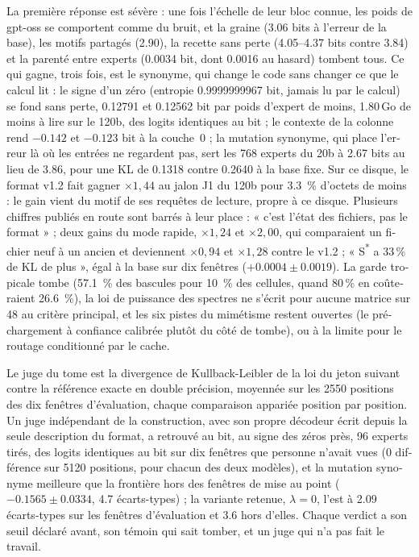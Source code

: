 \begin{otherlanguage}{french}
La première réponse est sévère : une fois l'échelle de leur bloc connue, les poids de gpt-oss se comportent comme du bruit, et la graine (\num{3.06} bits à l'erreur de la base), les motifs partagés (\num{2.90}), la recette sans perte (\numrange{4.05}{4.37} bits contre \num{3.84}) et la parenté entre experts (\num{0.0034} bit, dont \num{0.0016} au hasard) tombent tous. Ce qui gagne, trois fois, est le synonyme, qui change le code sans changer ce que le calcul lit : le signe d'un zéro (entropie \num{0.9999999967} bit, jamais lu par le calcul) se fond sans perte, \num{0.12791} et \num{0.12562} bit par poids d'expert de moins, \num{1.80}\,Go de moins à lire sur le 120b, des logits identiques au bit ; le contexte de la colonne rend $-\num{0.142}$ et $-\num{0.123}$ bit à la couche~0 ; la mutation synonyme, qui place l'erreur là où les entrées ne regardent pas, sert les 768 experts du 20b à \num{2.67} bits au lieu de \num{3.86}, pour une KL de \num{0.1318} contre \num{0.2640} à la base fixe. Sur ce disque, le format v1.2 fait gagner $\times 1{,}44$ au jalon J1 du 120b pour \SI{3.3}{\percent} d'octets de moins : le gain vient du motif de ses requêtes de lecture, propre à ce disque. Plusieurs chiffres publiés en route sont barrés à leur place : « c'est l'état des fichiers, pas le format » ; deux gains du mode rapide, $\times 1{,}24$ et $\times 2{,}00$, qui comparaient un fichier neuf à un ancien et deviennent $\times 0{,}94$ et $\times 1{,}28$ contre le v1.2 ; « S\textsuperscript{*} a 33\,\% de KL de plus », égal à la base sur dix fenêtres ($+\num{0.0004} \pm \num{0.0019}$). La garde tropicale tombe (\SI{57.1}{\percent} des bascules pour \SI{10}{\percent} des cellules, quand 80\,\% en coûteraient \SI{26.6}{\percent}), la loi de puissance des spectres ne s'écrit pour aucune matrice sur 48 au critère principal, et les six pistes du mimétisme restent ouvertes (le préchargement à confiance calibrée plutôt du côté de tombe), ou à la limite pour le routage conditionné par le cache.

Le juge du tome est la divergence de Kullback-Leibler de la loi du jeton suivant contre la référence exacte en double précision, moyennée sur les \num{2550} positions des dix fenêtres d'évaluation, chaque comparaison appariée position par position. Un juge indépendant de la construction, avec son propre décodeur écrit depuis la seule description du format, a retrouvé au bit, au signe des zéros près, 96 experts tirés, des logits identiques au bit sur dix fenêtres que personne n'avait vues (0 différence sur \num{5120} positions, pour chacun des deux modèles), et la mutation synonyme meilleure que la frontière hors des fenêtres de mise au point ($-\num{0.1565} \pm \num{0.0334}$, \num{4.7} écarts-types) ; la variante retenue, $\lambda = 0$, l'est à \num{2.09} écarts-types sur les fenêtres d'évaluation et \num{3.6} hors d'elles. Chaque verdict a son seuil déclaré avant, son témoin qui sait tomber, et un juge qui n'a pas fait le travail.


\end{otherlanguage}

